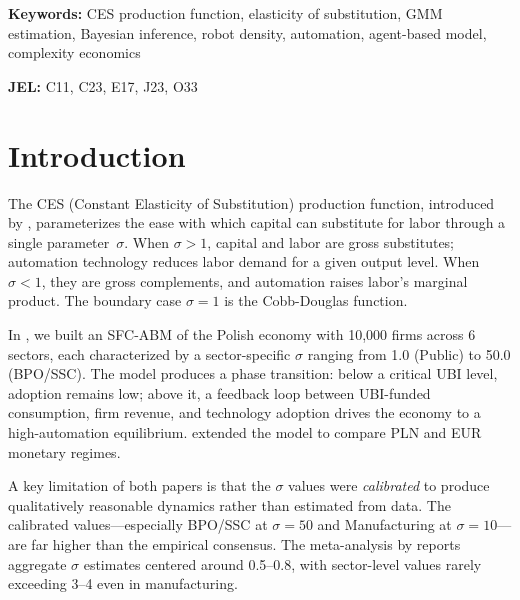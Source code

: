 \documentclass[11pt,a4paper]{article}
\begin{document}
\begin{center}
\begin{minipage}{0.85\textwidth}
\vspace{0.3cm}
\noindent\textbf{Keywords:} CES production function, elasticity of substitution, GMM estimation, Bayesian inference, robot density, automation, agent-based model, complexity economics

\vspace{0.3cm}
\noindent\textbf{JEL:} C11, C23, E17, J23, O33
\end{minipage}
\end{center}

\vspace{0.5cm}


\section{Introduction}
\label{sec:intro}

The CES (Constant Elasticity of Substitution) production function, introduced by \autocite{arrow1961capital}, parameterizes the ease with which capital can substitute for labor through a single parameter~$\sigma$.
When $\sigma > 1$, capital and labor are gross substitutes; automation technology reduces labor demand for a given output level.
When $\sigma < 1$, they are gross complements, and automation raises labor's marginal product.
The boundary case $\sigma = 1$ is the Cobb-Douglas function.

In \autocite{maciaszek2026acceleration}, we built an SFC-ABM of the Polish economy with 10,000 firms across 6 sectors, each characterized by a sector-specific $\sigma$ ranging from 1.0 (Public) to 50.0 (BPO/SSC).
The model produces a phase transition: below a critical UBI level, adoption remains low; above it, a feedback loop between UBI-funded consumption, firm revenue, and technology adoption drives the economy to a high-automation equilibrium.
\autocite{maciaszek2026monetary} extended the model to compare PLN and EUR monetary regimes.

A key limitation of both papers is that the $\sigma$ values were \emph{calibrated} to produce qualitatively reasonable dynamics rather than estimated from data.
The calibrated values---especially BPO/SSC at $\sigma=50$ and Manufacturing at $\sigma=10$---are far higher than the empirical consensus.
The meta-analysis by \autocite{knoblach2020what} reports aggregate $\sigma$ estimates centered around 0.5--0.8, with sector-level values rarely exceeding 3--4 even in manufacturing.
\end{document}

